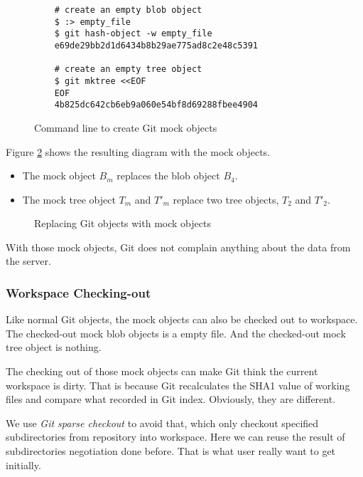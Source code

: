 \documentclass[preprint]{sigplanconf}
\begin{document}
\begin{figure}[htpb]
  \centering
  \begin{verbatim}
    # create an empty blob object
    $ :> empty_file
    $ git hash-object -w empty_file
    e69de29bb2d1d6434b8b29ae775ad8c2e48c5391

    # create an empty tree object
    $ git mktree <<EOF
    EOF
    4b825dc642cb6eb9a060e54bf8d69288fbee4904
  \end{verbatim}
  \caption{Command line to create Git mock objects}
  \label{fig:cmd-create-mock}
\end{figure}

Figure \ref{fig:mock-objects} shows the resulting diagram with the mock objects.

\begin{itemize}
  \item The mock object $B_m$ replaces the blob object $B_4$.
  \item The mock tree object $T_m$ and $T'_m$ replace two tree objects, $T_2$ and $T'_2$.
\end{itemize}

\begin{figure}[htpb]
  \centering
  
  \caption{Replacing Git objects with mock objects}
  \label{fig:mock-objects}
\end{figure}

With those mock objects, Git does not complain anything about the data from the server.

\subsubsection{Workspace Checking-out}
Like normal Git objects, the mock objects can also be checked out to workspace.
The checked-out mock blob objects is a empty file.
And the checked-out mock tree object is nothing.

The checking out of those mock objects can make Git think the current workspace is dirty.
That is because Git recalculates the SHA1 value of working files and compare what recorded in Git index.
Obviously, they are different.

We use \emph{Git sparse checkout} \cite{sparseco} to avoid that, which only
checkout specified subdirectories from repository into workspace.
Here we can reuse the result of subdirectories negotiation done before.
That is what user really want to get initially.
\end{document}
